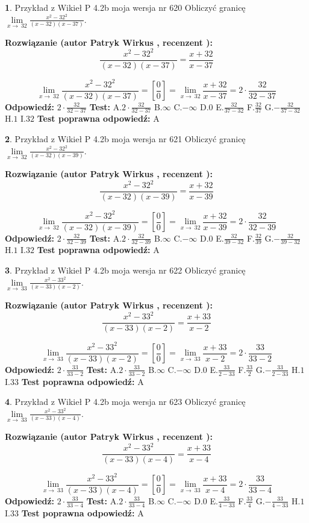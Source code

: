 \documentclass[12pt, a4paper]{article}
\theoremstyle{definition} %
\newtheorem{zad}{}
\newcommand{\zadStart}[1]{\begin{zad}#1\newline}
\newcommand{\zadStop}{\end{zad}}
\newcommand{\rozwStart}[2]{\noindent \textbf{Rozwiązanie (autor #1 , recenzent #2): }\newline}
\newcommand{\rozwStop}{\newline}
\newcommand{\odpStart}{\noindent \textbf{Odpowiedź:}\newline}
\newcommand{\odpStop}{\newline}
\newcommand{\testStart}{\noindent \textbf{Test:}\newline}
\newcommand{\testStop}{\newline}
\newcommand{\kluczStart}{\noindent \textbf{Test poprawna odpowiedź:}\newline}
\newcommand{\kluczStop}{\newline}
\begin{document}
\zadStart{Przykład z Wikieł P 4.2b moja wersja nr 620}
Obliczyć granicę $\lim\limits_{x\to\ 32}\frac{x^{2}-32^{2}}{(x-32)(x-37)}$.
\zadStop
\rozwStart{Patryk Wirkus}{}
$$\frac{x^{2}-32^{2}}{(x-32)(x-37)}=\frac{x+32}{x-37}$$

$$\lim\limits_{x\to\ 32}\frac{x^{2}-32^{2}}{(x-32)(x-37)}=[\frac{0}{0}]=\lim\limits_{x\to\ 32}\frac{x+32}{x-37}=2 \cdot \frac{32}{32-37}$$
\rozwStop
\odpStart
$2 \cdot \frac{32}{32-37}$
\odpStop
\testStart
A.$2 \cdot \frac{32}{32-37}$
B.$\infty$
C.$-\infty$
D.$0$
E.$\frac{32}{37-32}$
F.$\frac{32}{37}$
G.$-\frac{32}{37-32}$
H.$1$
I.$32$
\testStop
\kluczStart
A
\kluczStop



\zadStart{Przykład z Wikieł P 4.2b moja wersja nr 621}
Obliczyć granicę $\lim\limits_{x\to\ 32}\frac{x^{2}-32^{2}}{(x-32)(x-39)}$.
\zadStop
\rozwStart{Patryk Wirkus}{}
$$\frac{x^{2}-32^{2}}{(x-32)(x-39)}=\frac{x+32}{x-39}$$

$$\lim\limits_{x\to\ 32}\frac{x^{2}-32^{2}}{(x-32)(x-39)}=[\frac{0}{0}]=\lim\limits_{x\to\ 32}\frac{x+32}{x-39}=2 \cdot \frac{32}{32-39}$$
\rozwStop
\odpStart
$2 \cdot \frac{32}{32-39}$
\odpStop
\testStart
A.$2 \cdot \frac{32}{32-39}$
B.$\infty$
C.$-\infty$
D.$0$
E.$\frac{32}{39-32}$
F.$\frac{32}{39}$
G.$-\frac{32}{39-32}$
H.$1$
I.$32$
\testStop
\kluczStart
A
\kluczStop



\zadStart{Przykład z Wikieł P 4.2b moja wersja nr 622}
Obliczyć granicę $\lim\limits_{x\to\ 33}\frac{x^{2}-33^{2}}{(x-33)(x-2)}$.
\zadStop
\rozwStart{Patryk Wirkus}{}
$$\frac{x^{2}-33^{2}}{(x-33)(x-2)}=\frac{x+33}{x-2}$$

$$\lim\limits_{x\to\ 33}\frac{x^{2}-33^{2}}{(x-33)(x-2)}=[\frac{0}{0}]=\lim\limits_{x\to\ 33}\frac{x+33}{x-2}=2 \cdot \frac{33}{33-2}$$
\rozwStop
\odpStart
$2 \cdot \frac{33}{33-2}$
\odpStop
\testStart
A.$2 \cdot \frac{33}{33-2}$
B.$\infty$
C.$-\infty$
D.$0$
E.$\frac{33}{2-33}$
F.$\frac{33}{2}$
G.$-\frac{33}{2-33}$
H.$1$
I.$33$
\testStop
\kluczStart
A
\kluczStop



\zadStart{Przykład z Wikieł P 4.2b moja wersja nr 623}
Obliczyć granicę $\lim\limits_{x\to\ 33}\frac{x^{2}-33^{2}}{(x-33)(x-4)}$.
\zadStop
\rozwStart{Patryk Wirkus}{}
$$\frac{x^{2}-33^{2}}{(x-33)(x-4)}=\frac{x+33}{x-4}$$

$$\lim\limits_{x\to\ 33}\frac{x^{2}-33^{2}}{(x-33)(x-4)}=[\frac{0}{0}]=\lim\limits_{x\to\ 33}\frac{x+33}{x-4}=2 \cdot \frac{33}{33-4}$$
\rozwStop
\odpStart
$2 \cdot \frac{33}{33-4}$
\odpStop
\testStart
A.$2 \cdot \frac{33}{33-4}$
B.$\infty$
C.$-\infty$
D.$0$
E.$\frac{33}{4-33}$
F.$\frac{33}{4}$
G.$-\frac{33}{4-33}$
H.$1$
I.$33$
\testStop
\kluczStart
A
\kluczStop
\end{document}
